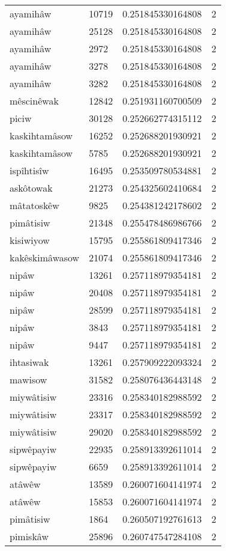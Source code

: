 \begin{longtable}{llll}
ayamihâw & 10719 & 0.251845330164808 & 2 \\
ayamihâw & 25128 & 0.251845330164808 & 2 \\
ayamihâw & 2972 & 0.251845330164808 & 2 \\
ayamihâw & 3278 & 0.251845330164808 & 2 \\
ayamihâw & 3282 & 0.251845330164808 & 2 \\
mêscinêwak & 12842 & 0.251931160700509 & 2 \\
piciw & 30128 & 0.252662774315112 & 2 \\
kaskihtamâsow & 16252 & 0.252688201930921 & 2 \\
kaskihtamâsow & 5785 & 0.252688201930921 & 2 \\
ispîhtisîw & 16495 & 0.253509780534881 & 2 \\
askôtowak & 21273 & 0.254325602410684 & 2 \\
mâtatoskêw & 9825 & 0.254381242178602 & 2 \\
pimâtisiw & 21348 & 0.255478486986766 & 2 \\
kisiwiyow & 15795 & 0.255861809417346 & 2 \\
kakêskimâwasow & 21074 & 0.255861809417346 & 2 \\
nipâw & 13261 & 0.257118979354181 & 2 \\
nipâw & 20408 & 0.257118979354181 & 2 \\
nipâw & 28599 & 0.257118979354181 & 2 \\
nipâw & 3843 & 0.257118979354181 & 2 \\
nipâw & 9447 & 0.257118979354181 & 2 \\
ihtasiwak & 13261 & 0.257909222093324 & 2 \\
mawisow & 31582 & 0.258076436443148 & 2 \\
miywâtisiw & 23316 & 0.258340182988592 & 2 \\
miywâtisiw & 23317 & 0.258340182988592 & 2 \\
miywâtisiw & 29020 & 0.258340182988592 & 2 \\
sipwêpayiw & 22935 & 0.258913392611014 & 2 \\
sipwêpayiw & 6659 & 0.258913392611014 & 2 \\
atâwêw & 13589 & 0.260071604141974 & 2 \\
atâwêw & 15853 & 0.260071604141974 & 2 \\
pimâtisiw & 1864 & 0.260507192761613 & 2 \\
pimiskâw & 25896 & 0.260747547284108 & 2 \\

\end{longtable}
